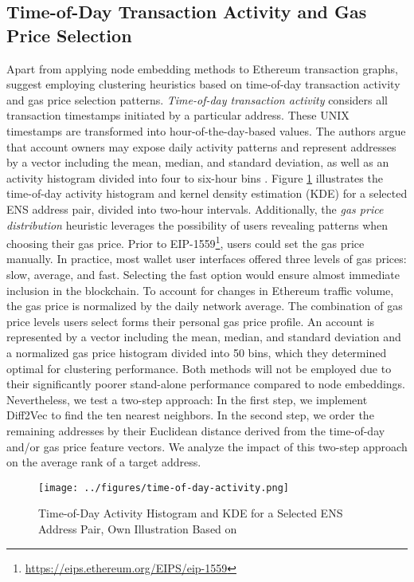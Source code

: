 \documentclass[12pt,a4paper,titlepage,oneside,english]{article}
\begin{document}
\subsection{Time-of-Day Transaction Activity and Gas Price Selection}
Apart from applying node embedding methods to Ethereum transaction graphs, \cite{Beres2020} suggest employing clustering heuristics based on time-of-day transaction activity and gas price selection patterns. \newline
\textit{Time-of-day transaction activity} considers all transaction timestamps initiated by a particular address. These UNIX timestamps are transformed into hour-of-the-day-based values. The authors argue that account owners may expose daily activity patterns and represent addresses by a vector including the mean, median, and standard deviation, as well as an activity histogram divided into four to six-hour bins \citep{Beres2020}.  Figure \ref{fig:ToD} illustrates the time-of-day activity histogram and kernel density estimation (KDE) for a selected ENS address pair, divided into two-hour intervals.\newline
Additionally, the \textit{gas price distribution} heuristic leverages the possibility of users revealing patterns when choosing their gas price. Prior to EIP-1559\footnote{\url{https://eips.ethereum.org/EIPS/eip-1559}}, users could set the gas price manually. In practice, most wallet user interfaces offered three levels of gas prices: slow, average, and fast. Selecting the fast option would ensure almost immediate inclusion in the blockchain. To account for changes in Ethereum traffic volume, the gas price is normalized by the daily network average. The combination of gas price levels users select forms their personal gas price profile. An account is represented by a vector including the mean, median, and standard deviation and a normalized gas price histogram divided into 50 bins, which they determined optimal for clustering performance. \citep{Beres2020} \newline
Both methods will not be employed due to their significantly poorer stand-alone performance compared to node embeddings. Nevertheless, we test a two-step approach: In the first step, we implement Diff2Vec to find the ten nearest neighbors. In the second step, we order the remaining addresses by their Euclidean distance derived from the time-of-day and/or gas price feature vectors. We analyze the impact of this two-step approach on the average rank of a target address.

\begin{figure}[h!]
	\centering
	\texttt{[image: ../figures/time-of-day-activity.png]}
	\caption{Time-of-Day Activity Histogram and KDE for a Selected ENS Address Pair, Own Illustration Based on \cite{Beres2020}}
	\label{fig:ToD}
\end{figure} 
\end{document}
